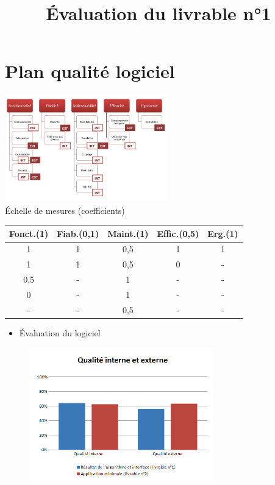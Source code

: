 \documentclass[xcolor=dvipsnames]{beamer}
\begin{document}

\section{Plan qualit\'e logiciel}
	\begin{frame}{\secname}
		\title{\'Evaluation du livrable n°1}
		\begin{center}	
			\includegraphics[width=7cm]{iso9126}
			\\\'Echelle de mesures (coefficients)\\
			\smallskip
			\footnotesize
			\begin{tabular}{|c|c|c|c|c|}
				\hline
				Fonct.(1) & Fiab.(0,1) & Maint.(1) & Effic.(0,5) & Erg.(1)\\
				\hline
				\hline
				1 & 1 & 0,5 & 1 & 1\\
				\hline
				1 & 1 & 0,5 & 0 & - \\
				\hline
				0,5 & - & 1 & - & -\\
				\hline
				0 & - & 1 & - & - \\
				\hline
				- & - & 0,5 & - & - \\
				\hline
			\end{tabular}	
		\end{center}
	\end{frame}


	\begin{frame}{\secname}
		\begin{itemize}
			\item \'Evaluation du logiciel 
		\end{itemize}
		\begin{figure}
			\includegraphics[width=8cm]{Images/QualiteInterneExterne.png}
		\end{figure}
	\end{frame}
\end{document}
